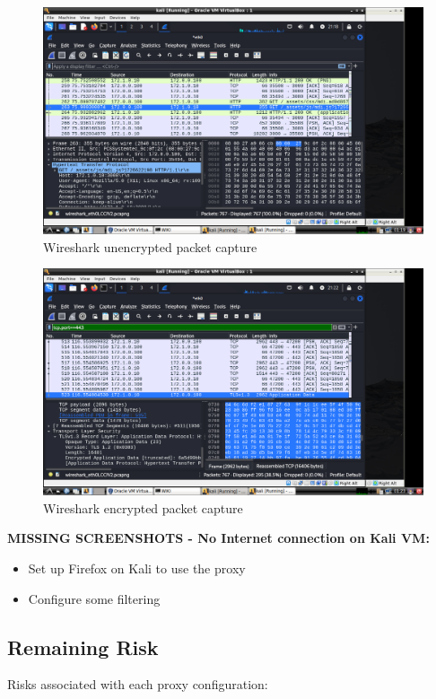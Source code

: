 \documentclass[12pt,a4paper]{report}
\begin{document}
\begin{figure}[H]
	\centering
	\includegraphics[width=\textwidth]{wireshark unencrypted packet captures.png}
	\caption{Wireshark unencrypted packet capture}
\end{figure}

\begin{figure}[H]
	\centering
	\includegraphics[width=\textwidth]{wireshark encrypted packet captures.png}
	\caption{Wireshark encrypted packet capture}
\end{figure}

\textbf{MISSING SCREENSHOTS - No Internet connection on Kali VM: }

\begin{itemize}
\item Set up Firefox on Kali to use the proxy
\item Configure some filtering
\end{itemize}


\subsection{Remaining Risk}
Risks associated with each proxy configuration:\\
\end{document}
